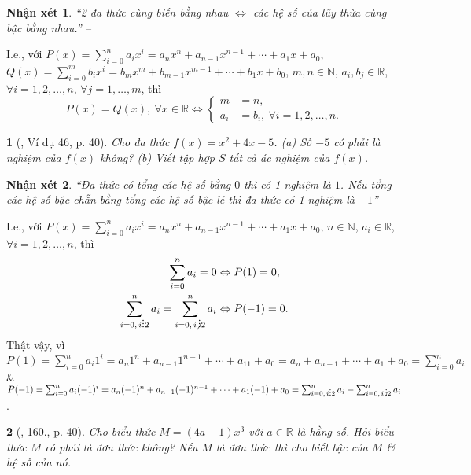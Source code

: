 \documentclass{article}
\newtheorem{baitoan}{}
\newtheorem{nhanxet}{Nhận xét}
\DeclareRobustCommand{\divby}{%
	\mathrel{\vbox{\baselineskip.65ex\lineskiplimit0pt\hbox{.}\hbox{.}\hbox{.}}}%
}
\begin{document}
\begin{nhanxet}
	``2 đa thức cùng biến bằng nhau $\Leftrightarrow$ các hệ số của lũy thừa cùng bậc bằng nhau.'' -- \cite[p. 40]{Tuyen_Toan_7}
\end{nhanxet}
I.e., với $P(x) = \sum_{i=0}^n a_ix^i = a_nx^n + a_{n-1}x^{n-1} + \cdots + a_1x + a_0$, $Q(x) = \sum_{i=0}^m b_ix^i = b_mx^m + b_{m-1}x^{m-1} + \cdots + b_1x + b_0$, $m,n\in\mathbb{N}$, $a_i,b_j\in\mathbb{R}$, $\forall i = 1,2,\ldots,n$, $\forall j = 1,\ldots,m$, thì
\begin{equation*}
	P(x) = Q(x),\ \forall x\in\mathbb{R}\Leftrightarrow\left\{\begin{split}
		m &= n,\\
		a_i &= b_i,\ \forall i = 1,2,\ldots,n.
	\end{split}\right.
\end{equation*}

\begin{baitoan}[\cite{Tuyen_Toan_7}, Ví dụ 46, p. 40]
	Cho đa thức $f(x) = x^2 + 4x - 5$. (a) Số $-5$ có phải là nghiệm của $f(x)$ không? (b) Viết tập hợp $S$ tất cả ác nghiệm của $f(x)$.
\end{baitoan}

\begin{nhanxet}
	``Đa thức có tổng các hệ số bằng $0$ thì có 1 nghiệm là $1$. Nếu tổng các hệ số bậc chẵn bằng tổng các hệ số bậc lẻ thì đa thức có 1 nghiệm là $-1$'' -- \cite[p. 40]{Tuyen_Toan_7}
\end{nhanxet}
I.e., với $P(x) = \sum_{i=0}^n a_ix^i = a_nx^n + a_{n-1}x^{n-1} + \cdots + a_1x + a_0$, $n\in\mathbb{N}$, $a_i\in\mathbb{R}$, $\forall i = 1,2,\ldots,n$, thì
\begin{align*}
	\sum_{i=0}^n a_i = 0&\Leftrightarrow P(1) = 0,\\
	\sum_{i=0,\,i\divby 2}^n a_i = \sum_{i=0,\,i\not\,\divby 2}^n a_i&\Leftrightarrow P(-1) = 0.
\end{align*}
Thật vậy, vì $P(1) = \sum_{i=0}^n a_i1^i = a_n1^n + a_{n-1}1^{n-1} + \cdots + a_11 + a_0 = a_n + a_{n-1} + \cdots + a_1 + a_0 = \sum_{i=0}^n a_i$ \& $P(-1) = \sum_{i=0}^n a_i(-1)^i = a_n(-1)^n + a_{n-1}(-1)^{n-1} + \cdots + a_1(-1) + a_0 = \sum_{i=0,\,i\divby 2}^n a_i - \sum_{i=0,\,i\not\,\divby 2}^n a_i$.

\begin{baitoan}[\cite{Tuyen_Toan_7}, 160., p. 40]
	Cho biểu thức $M = (4a + 1)x^3$ với $a\in\mathbb{R}$ là hằng số. Hỏi biểu thức $M$ có phải là đơn thức không? Nếu $M$ là đơn thức thì cho biết bậc của $M$ \& hệ số của nó.
\end{baitoan}
\end{document}
